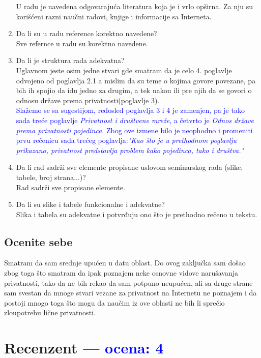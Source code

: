 \documentclass[a4paper]{report}
\newcommand{\odgovor}[1]{\textcolor{blue}{#1}}
\begin{document}
\begin{enumerate}
U radu je navedena odgovarajuća literatura koja je i vrlo opširna. Za nju su korišćeni razni naučni radovi, knjige i informacije sa Interneta. 
\item Da li su u radu reference korektno navedene?\\
Sve refernce u radu su korektno navedene.
\item Da li je struktura rada adekvatna?\\
Uglavnom jeste osim jedne stvari gde smatram da je celo 4. poglavlje odvojeno od poglavlja 2.1 a mislim da su teme o kojima govore povezane, pa bih ih spojio da idu jedno za drugim, a tek nakon ili pre njih da se govori o odnosu države prema privatnosti(poglavlje 3).
\\
\odgovor{Slažemo se sa sugestijom, redosled poglavlja 3 i 4 je zamenjen, pa je tako sada treće poglavlje \emph{Privatnost i društvene mreže}, a četvrto je \emph{Odnos države prema privatnosti pojedinca}. Zbog ove izmene bilo je neophodno i promeniti prvu rečenicu sada trećeg poglavlja:\emph{"Kao što je u prethodnom poglavlju prikazano, privatnost predstavlja problem kako pojedinca, tako i društva."}}
\item Da li rad sadrži sve elemente propisane uslovom seminarskog rada (slike, tabele, broj strana...)?\\
Rad sadrži sve propisane elemente.
\item Da li su slike i tabele funkcionalne i adekvatne?\\
Slika i tabela su adekvatne i potvrđuju ono što je prethodno rečeno u tekstu.
\end{enumerate}

\section{Ocenite sebe}
Smatram da sam srednje upućen u datu oblast. Do ovog zaključka sam došao zbog toga što smatram da ipak poznajem neke osnovne vidove narušavanja privatnosti, tako da ne bih rekao da sam potpuno neupućen, ali sa druge strane sam svestan da mnoge stvari vezane za privatnost na Internetu ne poznajem i da postoji mnogo toga što mogu da naučim iz ove oblasti ne bih li sprečio zloupotrebu lične privatnosti. 

\chapter{Recenzent \odgovor{--- ocena: 4} }
\end{document}
